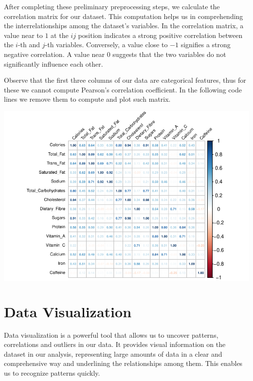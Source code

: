 \documentclass[
]{article}
\begin{document}
After completing these preliminary preprocessing steps, we calculate the
correlation matrix for our dataset. This computation helps us in
comprehending the interrelationships among the dataset's variables. In
the correlation matrix, a value near to \(1\) at the \(ij\) position
indicates a strong positive correlation between the \(i\)-th and
\(j\)-th variables. Conversely, a value close to \(-1\) signifies a
strong negative correlation. A value near \(0\) suggests that the two
variables do not significantly influence each other.

Observe that the first three columns of our data are categorical
features, thus for these we cannot compute Pearson's correlation
coefficient. In the following code lines we remove them to compute and
plot such matrix.

\begin{center}\includegraphics{Statistical_Learning_Final_Report_files/figure-latex/correlation_analysis-1} \end{center}

\hypertarget{data-visualization}{%
\section{Data Visualization}\label{data-visualization}}

Data visualization is a powerful tool that allows us to uncover
patterns, correlations and outliers in our data. It provides visual
information on the dataset in our analysis, representing large amounts
of data in a clear and comprehensive way and underlining the
relationships among them. This enables us to recognize patterns quickly.
\end{document}
